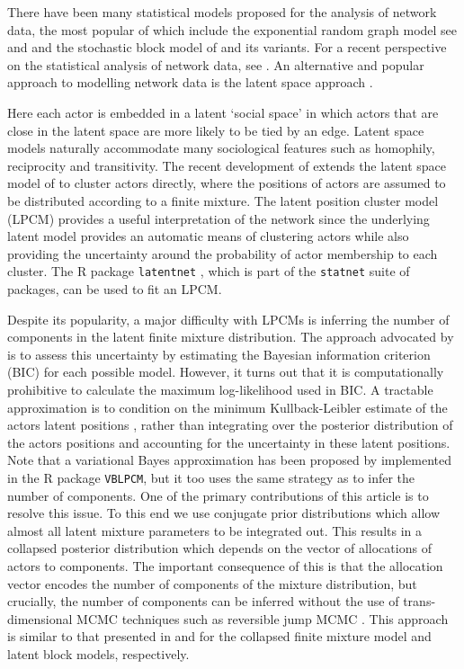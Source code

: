 \documentclass[12pt]{article}
\begin{document}
There have been many statistical models proposed for the analysis of network data, the most popular of which include the 
exponential random graph model see  and 
 and the stochastic block model of  and its variants. 
For a recent perspective on the statistical analysis of network data, see .
An alternative and popular approach to modelling network data is the latent space approach \cite{hoff:raft:hand02}. 

Here each actor is embedded in a latent `social space' in which actors that are close in the latent space are more likely to be tied by an edge. 
Latent space models naturally accommodate many sociological features such as homophily, reciprocity 
and transitivity.
The recent development of  extends the latent space model of 
 to cluster actors directly, where the positions of actors are assumed to be distributed according
to a finite mixture. 
The latent position cluster model (LPCM) provides a useful interpretation of the network since the underlying latent model 
provides an automatic means of clustering actors while also providing the uncertainty around the probability of actor membership
to each cluster. The R package \texttt{latentnet} \cite{Kriv:Hand07,Kriv:Hand13}, which is part of the \texttt{statnet} 
suite of packages, can be used to fit an LPCM. 


Despite its popularity, a major difficulty with LPCMs is inferring the number of components in the 
latent finite mixture distribution. The approach advocated by  is to assess this uncertainty by estimating the Bayesian
information criterion (BIC) for each possible model. However, it turns out that it is computationally prohibitive to calculate the maximum log-likelihood
used in BIC. A tractable approximation is to condition on the minimum Kullback-Leibler  estimate of the actors latent positions \cite{shortreedetal06},
rather than integrating over the posterior distribution of the actors positions and accounting for the uncertainty in
these latent positions. Note that a variational Bayes approximation has been proposed by  implemented in the R package \texttt{VBLPCM}, but it too uses the same strategy as  to infer the number of components.
One of the primary contributions of this article is to resolve this issue. To this end we use conjugate prior distributions which
allow almost all latent mixture parameters to be integrated out. This results in a collapsed posterior distribution which depends on the
vector of allocations of actors to components. The important consequence of this is that the allocation vector encodes the number of components of the mixture distribution, but crucially,
the number of components can be inferred without the use of 
trans-dimensional MCMC techniques such as reversible jump MCMC \cite{richardson:green97}. This approach is similar 
to that presented in  and  for the collapsed finite mixture model and
latent block models, respectively. 
\end{document}
